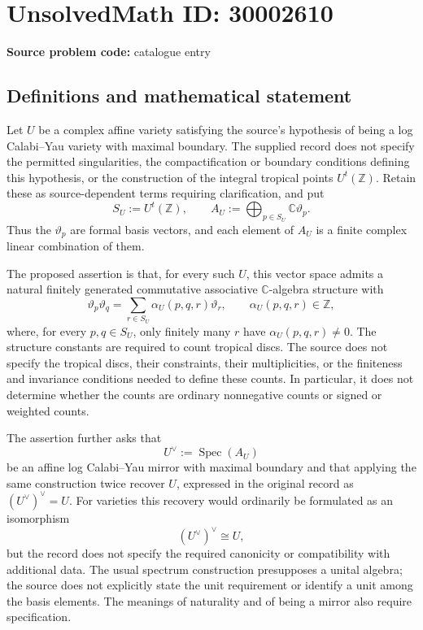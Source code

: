 \documentclass[11pt]{article}
\newcommand{\Z}{\mathbb{Z}}
\newcommand{\C}{\mathbb{C}}
\begin{document}
\section*{UnsolvedMath ID: 30002610}
\textbf{Source problem code:} catalogue entry
\subsection{Definitions and mathematical statement}
Let \(U\) be a complex affine variety satisfying the source's hypothesis of being a log Calabi--Yau variety with maximal boundary. The supplied record does not specify the permitted singularities, the compactification or boundary conditions defining this hypothesis, or the construction of the integral tropical points \(U^t(\Z)\). Retain these as source-dependent terms requiring clarification, and put
\[
S_U:=U^t(\Z),\qquad A_U:=\bigoplus_{p\in S_U}\C\vartheta_p.
\]
Thus the \(\vartheta_p\) are formal basis vectors, and each element of \(A_U\) is a finite complex linear combination of them.

The proposed assertion is that, for every such \(U\), this vector space admits a natural finitely generated commutative associative \(\C\)-algebra structure with
\[
\vartheta_p\vartheta_q=\sum_{r\in S_U}\alpha_U(p,q,r)\vartheta_r,
\qquad \alpha_U(p,q,r)\in\Z,
\]
where, for every \(p,q\in S_U\), only finitely many \(r\) have \(\alpha_U(p,q,r)\ne0\). The structure constants are required to count tropical discs. The source does not specify the tropical discs, their constraints, their multiplicities, or the finiteness and invariance conditions needed to define these counts. In particular, it does not determine whether the counts are ordinary nonnegative counts or signed or weighted counts.

The assertion further asks that
\[
U^\vee:=\operatorname{Spec}(A_U)
\]
be an affine log Calabi--Yau mirror with maximal boundary and that applying the same construction twice recover \(U\), expressed in the original record as \((U^\vee)^\vee=U\). For varieties this recovery would ordinarily be formulated as an isomorphism
\[
(U^\vee)^\vee\cong U,
\]
but the record does not specify the required canonicity or compatibility with additional data. The usual spectrum construction presupposes a unital algebra; the source does not explicitly state the unit requirement or identify a unit among the basis elements. The meanings of naturality and of being a mirror also require specification.
\end{document}
